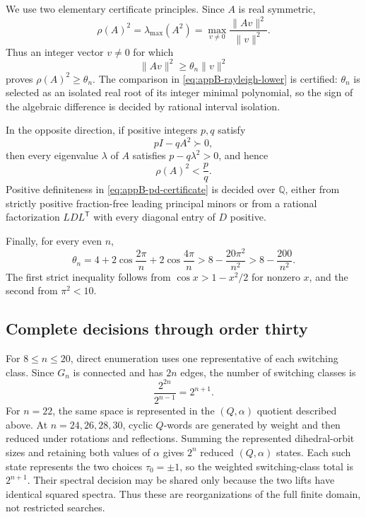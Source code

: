 We use two elementary certificate principles. Since \(A\) is real
symmetric,
\begin{equation}\label{eq:appB-rayleigh}
 \rho(A)^2=\lambda_{\max}(A^2)
 =\max_{v\ne0}\frac{\lVert Av\rVert^2}{\lVert v\rVert^2}.
\end{equation}
Thus an integer vector \(v\ne0\) for which
\begin{equation}\label{eq:appB-rayleigh-lower}
 \lVert Av\rVert^2\geq\theta_n\lVert v\rVert^2
\end{equation}
proves \(\rho(A)^2\geq\theta_n\).  The comparison in
\eqref{eq:appB-rayleigh-lower} is certified: \(\theta_n\) is selected as an
isolated real root of its integer minimal polynomial, so the sign of the
algebraic difference is decided by rational interval isolation.

In the opposite direction, if positive integers \(p,q\) satisfy
\begin{equation}\label{eq:appB-pd-certificate}
 pI-qA^2\succ0,
\end{equation}
then every eigenvalue \(\lambda\) of \(A\) satisfies
\(p-q\lambda^2>0\), and hence
\begin{equation}\label{eq:appB-pd-consequence}
 \rho(A)^2<\frac pq.
\end{equation}
Positive definiteness in \eqref{eq:appB-pd-certificate} is decided over
\(\mathbb Q\), either from strictly positive fraction-free leading principal
minors or from a rational factorization \(LDL^{\mathsf T}\) with every diagonal entry of
\(D\) positive.

Finally, for every even \(n\),
\begin{equation}\label{eq:appB-cosine-bound}
 \theta_n
 =4+2\cos\frac{2\pi}{n}+2\cos\frac{4\pi}{n}
 >8-\frac{20\pi^2}{n^2}
 >8-\frac{200}{n^2}.
\end{equation}
The first strict inequality follows from
\(\cos x>1-x^2/2\) for nonzero \(x\), and the second from \(\pi^2<10\).

\subsection{Complete decisions through order thirty}
\label{app:orders-8-30}

For \(8\leq n\leq20\), direct enumeration uses one representative of each
switching class.  Since \(G_n\) is connected and has \(2n\) edges, the
number of switching classes is
\[
 \frac{2^{2n}}{2^{n-1}}=2^{n+1}.
\]
For \(n=22\), the same space is represented in the \((Q,\alpha)\) quotient
described above.  At \(n=24,26,28,30\), cyclic \(Q\)-words are generated by
weight and then reduced under rotations and reflections.  Summing the
represented dihedral-orbit sizes and retaining both values of \(\alpha\)
gives \(2^n\) reduced \((Q,\alpha)\) states.  Each such state represents the
two choices \(\tau_0=\pm1\), so the weighted switching-class total is
\(2^{n+1}\).  Their spectral decision may be shared only because the two
lifts have identical squared spectra.  Thus these are reorganizations of the
full finite domain, not restricted searches.

